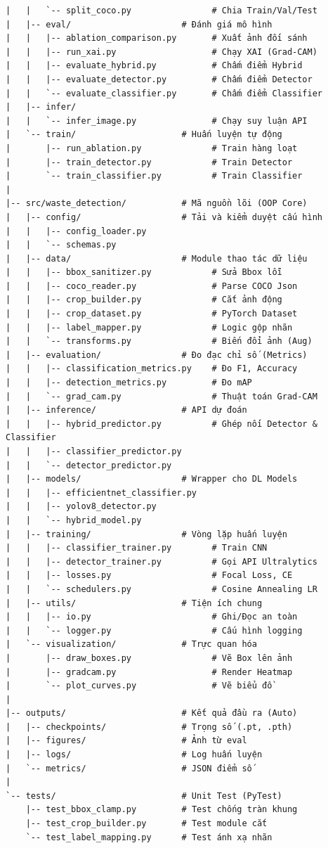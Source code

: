\documentclass[12pt, a4paper]{article}
\begin{document}
\begin{tcolorbox}[colback=gray!5!white, colframe=gray!50!black, title=Cấu trúc cây thư mục chi tiết dự án ADN\_pipeline, breakable]
\begin{verbatim}
|   |   `-- split_coco.py                # Chia Train/Val/Test
|   |-- eval/                      # Đánh giá mô hình
|   |   |-- ablation_comparison.py       # Xuất ảnh đối sánh
|   |   |-- run_xai.py                   # Chạy XAI (Grad-CAM)
|   |   |-- evaluate_hybrid.py           # Chấm điểm Hybrid
|   |   |-- evaluate_detector.py         # Chấm điểm Detector
|   |   `-- evaluate_classifier.py       # Chấm điểm Classifier
|   |-- infer/
|   |   `-- infer_image.py               # Chạy suy luận API
|   `-- train/                     # Huấn luyện tự động
|       |-- run_ablation.py              # Train hàng loạt
|       |-- train_detector.py            # Train Detector
|       `-- train_classifier.py          # Train Classifier
|
|-- src/waste_detection/           # Mã nguồn lõi (OOP Core)
|   |-- config/                    # Tải và kiểm duyệt cấu hình
|   |   |-- config_loader.py       
|   |   `-- schemas.py
|   |-- data/                      # Module thao tác dữ liệu
|   |   |-- bbox_sanitizer.py            # Sửa Bbox lỗi
|   |   |-- coco_reader.py               # Parse COCO Json
|   |   |-- crop_builder.py              # Cắt ảnh động
|   |   |-- crop_dataset.py              # PyTorch Dataset
|   |   |-- label_mapper.py              # Logic gộp nhãn
|   |   `-- transforms.py                # Biến đổi ảnh (Aug)
|   |-- evaluation/                # Đo đạc chỉ số (Metrics)
|   |   |-- classification_metrics.py    # Đo F1, Accuracy
|   |   |-- detection_metrics.py         # Đo mAP
|   |   `-- grad_cam.py                  # Thuật toán Grad-CAM
|   |-- inference/                 # API dự đoán
|   |   |-- hybrid_predictor.py          # Ghép nối Detector & Classifier
|   |   |-- classifier_predictor.py
|   |   `-- detector_predictor.py
|   |-- models/                    # Wrapper cho DL Models
|   |   |-- efficientnet_classifier.py
|   |   |-- yolov8_detector.py
|   |   `-- hybrid_model.py
|   |-- training/                  # Vòng lặp huấn luyện
|   |   |-- classifier_trainer.py        # Train CNN
|   |   |-- detector_trainer.py          # Gọi API Ultralytics
|   |   |-- losses.py                    # Focal Loss, CE
|   |   `-- schedulers.py                # Cosine Annealing LR
|   |-- utils/                     # Tiện ích chung
|   |   |-- io.py                        # Ghi/Đọc an toàn
|   |   `-- logger.py                    # Cấu hình logging
|   `-- visualization/             # Trực quan hóa
|       |-- draw_boxes.py                # Vẽ Box lên ảnh
|       |-- gradcam.py                   # Render Heatmap
|       `-- plot_curves.py               # Vẽ biểu đồ
|
|-- outputs/                       # Kết quả đầu ra (Auto)
|   |-- checkpoints/               # Trọng số (.pt, .pth)
|   |-- figures/                   # Ảnh từ eval
|   |-- logs/                      # Log huấn luyện
|   `-- metrics/                   # JSON điểm số
|
`-- tests/                         # Unit Test (PyTest)
    |-- test_bbox_clamp.py         # Test chống tràn khung
    |-- test_crop_builder.py       # Test module cắt
    `-- test_label_mapping.py      # Test ánh xạ nhãn
\end{verbatim}
\end{tcolorbox}
\end{document}
